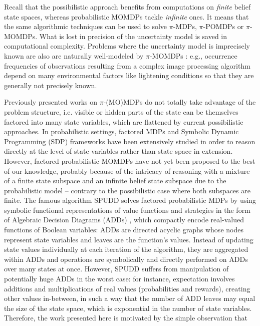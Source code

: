 Recall that the possibilistic approach benefits from computations 
on \emph{finite} belief state spaces, 
whereas probabilistic MOMDPs tackle \emph{infinite} ones. 
It means that the same algorithmic techniques can be used to solve $\pi$-MDPs,
$\pi$-POMDPs or $\pi$-MOMDPs. 
What is lost in precision of the uncertainty model is saved 
in computational complexity. Problems where the uncertainty model is
imprecisely known are also are naturally well-modeled by $\pi$-MOMDPs \cite{Drougard13}: 
e.g., occurrence frequencies of observations resulting from a complex
image processing algorithm depend on many environmental factors like lightening
conditions so that they are generally not precisely known.

Previously presented works on $\pi$-(MO)MDPs do not totally take advantage of
the problem structure, i.e. visible or hidden parts of the state can be
themselves factored into many state variables, which are flattened by
current possibilistic approaches. In probabilistic settings, factored MDPs and
Symbolic Dynamic Programming (SDP) frameworks
\cite{DBLP:journals/ai/BoutilierDG00,Hoey99spudd:stochastic} have been
extensively studied in order to reason directly at the level of state variables
rather than state space in extension. However, factored probabilistic
MOMDPs have not yet been proposed to the best of our knowledge, probably because
of the intricacy of reasoning with a mixture of a finite state subspace and an
infinite belief state subspace due to the probabilistic model -- contrary to the
possibilistic case where both subspaces are finite. The famous algorithm SPUDD
\cite{Hoey99spudd:stochastic} solves factored probabilistic MDPs by using
symbolic functional representations of value functions and strategies in the form
of Algebraic Decision Diagrams (ADDs) \cite{Bahar:1997:ADD}, which compactly
encode real-valued functions of Boolean variables: ADDs are directed acyclic
graphs whose nodes represent state variables and leaves are the function's
values. Instead of updating state values individually at each iteration of the
algorithm, they are aggregated within ADDs and operations are symbolically and
directly performed on ADDs over many states at once. However, SPUDD suffers from manipulation of
potentially huge ADDs in the worst case: for instance,
expectation involves additions and multiplications of real values (probabilities
and rewards), creating other values in-between, in such a way that the number of
ADD leaves may equal the size of the state space, which is exponential in the
number of state variables.
Therefore, the work presented here is motivated by the simple observation that
